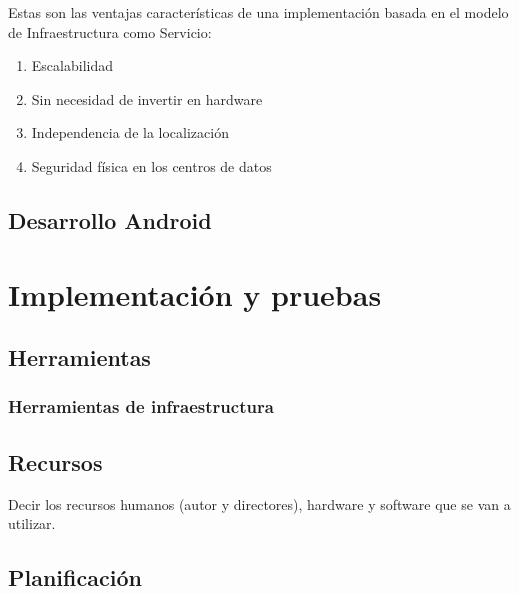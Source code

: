 \documentclass[a4paper,11pt]{book}
\begin{document}
Estas son las ventajas características de una implementación basada en el modelo de Infraestructura como Servicio:

\begin{enumerate}
\item Escalabilidad
\item Sin necesidad de invertir en hardware
\item Independencia de la localización
\item Seguridad física en los centros de datos
\end{enumerate}


\section{Desarrollo Android}


\chapter{Implementación y pruebas}

\section{Herramientas}
\subsection{Herramientas de infraestructura}


\section{Recursos}

Decir los recursos humanos (autor y directores), hardware y software que se van a utilizar.



\section{Planificación}
\end{document}
